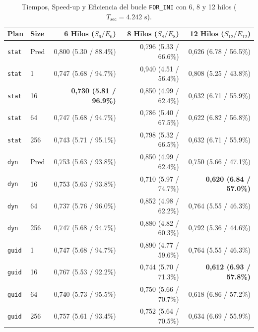 \documentclass[12pt]{article}
\begin{document}
\begin{enumerate}
\begin{table}[htbp]
    \centering
    \small
    \begin{tabular}{llrrr}
        \toprule
        \textbf{Plan} & \textbf{Size} & \textbf{6 Hilos ($S_6 / E_6$)} & \textbf{8 Hilos ($S_8 / E_8$)} & \textbf{12 Hilos ($S_{12} / E_{12}$)} \\
        \midrule
        \texttt{stat} & Pred & 0,800 (5.30 / 88.4\%) & 0,796 (5.33 / 66.6\%) & 0,626 (6.78 / 56.5\%) \\
        \texttt{stat} & 1    & 0,747 (5.68 / 94.7\%) & 0,940 (4.51 / 56.4\%) & 0,808 (5.25 / 43.8\%) \\
        \texttt{stat} & 16   & \textbf{0,730 (5.81 / 96.9\%)} & 0,850 (4.99 / 62.4\%) & 0,632 (6.71 / 55.9\%) \\
        \texttt{stat} & 64   & 0,747 (5.68 / 94.7\%) & 0,786 (5.40 / 67.5\%) & 0,622 (6.82 / 56.8\%) \\
        \texttt{stat} & 256  & 0,743 (5.71 / 95.1\%) & 0,798 (5.32 / 66.5\%) & 0,632 (6.71 / 55.9\%) \\
        \midrule
        \texttt{dyn} & Pred  & 0,753 (5.63 / 93.8\%) & 0,850 (4.99 / 62.4\%) & 0,750 (5.66 / 47.1\%) \\
        \texttt{dyn} & 16    & 0,753 (5.63 / 93.8\%) & 0,710 (5.97 / 74.7\%) & \textbf{0,620 (6.84 / 57.0\%)} \\
        \texttt{dyn} & 64    & 0,737 (5.76 / 96.0\%) & 0,852 (4.98 / 62.2\%) & 0,764 (5.55 / 46.3\%) \\
        \texttt{dyn} & 256   & 0,747 (5.68 / 94.7\%) & 0,880 (4.82 / 60.3\%) & 0,792 (5.36 / 44.6\%) \\
        \midrule
        \texttt{guid} & 1    & 0,747 (5.68 / 94.7\%) & 0,890 (4.77 / 59.6\%) & 0,764 (5.55 / 46.3\%) \\
        \texttt{guid} & 16   & 0,767 (5.53 / 92.2\%) & 0,744 (5.70 / 71.3\%) & \textbf{0,612 (6.93 / 57.8\%)} \\
        \texttt{guid} & 64   & 0,740 (5.73 / 95.5\%) & 0,750 (5.66 / 70.7\%) & 0,618 (6.86 / 57.2\%) \\
        \texttt{guid} & 256  & 0,757 (5.61 / 93.4\%) & 0,752 (5.64 / 70.5\%) & 0,634 (6.69 / 55.9\%) \\
        \bottomrule
    \end{tabular}
    \caption{Tiempos, Speed-up y Eficiencia del bucle \texttt{FOR\_INI} con 6, 8 y 12 hilos ($T_{\text{sec}} = 4.242\text{ s}$).}
    \label{tab:scheduling_for_ini_b}
\end{table}


\end{enumerate}
\end{document}
